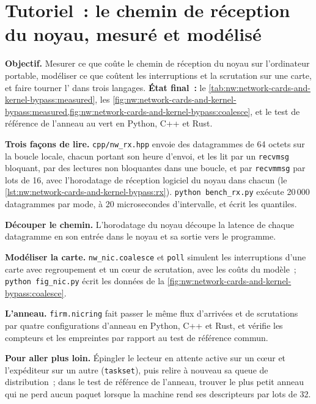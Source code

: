 \section{Tutoriel~: le chemin de réception du noyau, mesuré et modélisé}\label{tut:nw:network-cards-and-kernel-bypass:tut}

\begin{tutorial}
\textbf{Objectif.} Mesurer ce que coûte le chemin de réception du noyau sur l'ordinateur portable, modéliser ce que coûtent les interruptions et la scrutation sur une carte, et faire tourner
l' dans trois langages. \textbf{État final~:} le \cref{tab:nw:network-cards-and-kernel-bypass:measured},
les \cref{fig:nw:network-cards-and-kernel-bypass:measured,fig:nw:network-cards-and-kernel-bypass:coalesce}, et le test de référence de l'anneau au vert
en Python, C++ et Rust.
\begin{tutsteps}
\item \textbf{Trois façons de lire.} \texttt{cpp/nw\_rx.hpp} envoie des datagrammes de 64 octets sur la boucle locale, chacun portant son
  heure d'envoi, et les lit par un \texttt{recvmsg} bloquant, par des lectures non bloquantes dans une boucle, et par \texttt{recvmmsg} par lots de 16, avec l'horodatage de réception logiciel
  du noyau dans chacun (le \cref{lst:nw:network-cards-and-kernel-bypass:rx}). \texttt{python bench\_rx.py} exécute 20\,000 datagrammes par mode,
  à 20 microsecondes d'intervalle, et écrit les quantiles.
\item \textbf{Découper le chemin.} L'horodatage du noyau découpe la latence de chaque datagramme en son entrée dans le noyau et sa sortie
  vers le programme.
\item \textbf{Modéliser la carte.} \texttt{nw\_nic.coalesce} et \texttt{poll} simulent les interruptions d'une carte avec regroupement et un
  cœur de scrutation, avec les coûts du modèle~; \texttt{python fig\_nic.py} écrit les données de la \cref{fig:nw:network-cards-and-kernel-bypass:coalesce}.
\item \textbf{L'anneau.} \texttt{firm.nicring} fait passer le même flux d'arrivées et de scrutations par quatre configurations d'anneau en Python,
  C++ et Rust, et vérifie les compteurs et les empreintes par rapport au test de référence commun.
\end{tutsteps}
\textbf{Pour aller plus loin.} Épingler le lecteur en attente active sur un cœur et l'expéditeur sur un autre (\texttt{taskset}), puis relire à nouveau sa queue
de distribution~; dans le test de référence de l'anneau, trouver le plus petit anneau qui ne perd aucun paquet lorsque la machine rend ses descripteurs par lots de 32.
\end{tutorial}

